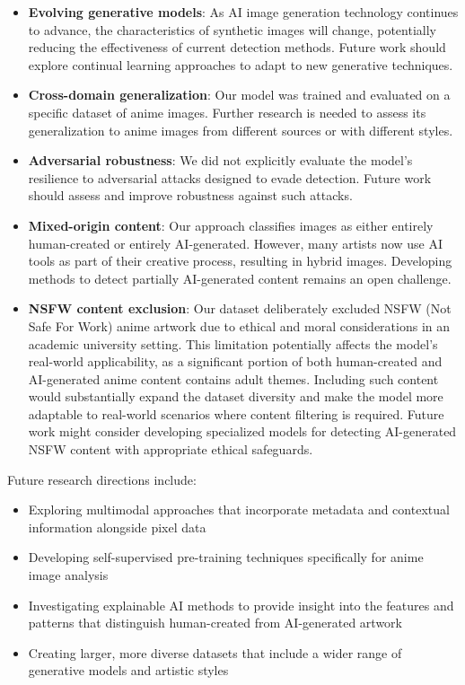 \documentclass{article}
\begin{document}
\begin{itemize}
    \item \textbf{Evolving generative models}: As AI image generation technology continues to advance, the characteristics of synthetic images will change, potentially reducing the effectiveness of current detection methods. Future work should explore continual learning approaches to adapt to new generative techniques.
    
    \item \textbf{Cross-domain generalization}: Our model was trained and evaluated on a specific dataset of anime images. Further research is needed to assess its generalization to anime images from different sources or with different styles.
    
    \item \textbf{Adversarial robustness}: We did not explicitly evaluate the model's resilience to adversarial attacks designed to evade detection. Future work should assess and improve robustness against such attacks.
    
    \item \textbf{Mixed-origin content}: Our approach classifies images as either entirely human-created or entirely AI-generated. However, many artists now use AI tools as part of their creative process, resulting in hybrid images. Developing methods to detect partially AI-generated content remains an open challenge.

    \item \textbf{NSFW content exclusion}: Our dataset deliberately excluded NSFW (Not Safe For Work) anime artwork due to ethical and moral considerations in an academic university setting. This limitation potentially affects the model's real-world applicability, as a significant portion of both human-created and AI-generated anime content contains adult themes. Including such content would substantially expand the dataset diversity and make the model more adaptable to real-world scenarios where content filtering is required. Future work might consider developing specialized models for detecting AI-generated NSFW content with appropriate ethical safeguards.
\end{itemize}

Future research directions include:

\begin{itemize}
    \item Exploring multimodal approaches that incorporate metadata and contextual information alongside pixel data
    
    \item Developing self-supervised pre-training techniques specifically for anime image analysis
    
    \item Investigating explainable AI methods to provide insight into the features and patterns that distinguish human-created from AI-generated artwork
    
    \item Creating larger, more diverse datasets that include a wider range of generative models and artistic styles
\end{itemize}
\end{document}
